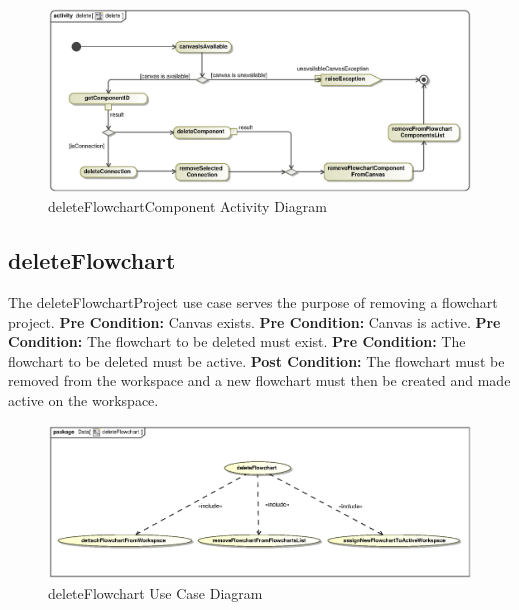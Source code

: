 \documentclass[12pt,a4paper,titlepage]{article}
\begin{document}
\begin{figure}[H]
  \centering
\includegraphics[width=500px]{deleteAct.eps}
\caption{deleteFlowchartComponent Activity Diagram}
\end{figure}

\newpage
\subsection{deleteFlowchart}
The deleteFlowchartProject use case serves the purpose of removing a flowchart project.\newline\newline
\textbf{Pre Condition:} Canvas exists.\newline
\textbf{Pre Condition:} Canvas is active.\newline
\textbf{Pre Condition:} The flowchart to be deleted must exist.\newline
\textbf{Pre Condition:} The flowchart to be deleted must be active.\newline\newline
\textbf{Post Condition:} The flowchart must be removed from the workspace and a new flowchart must then be created and made active on the workspace.

\begin{figure}[H]
  \centering
\includegraphics[width=500px]{deleteFlowchart.eps}
\caption{deleteFlowchart Use Case Diagram}
\end{figure}
\end{document}
